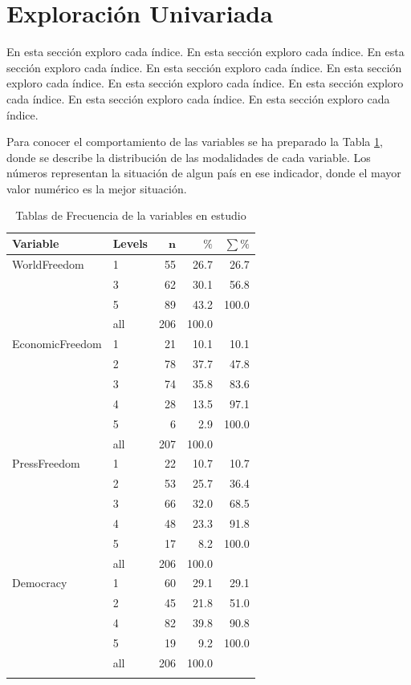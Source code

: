 \section{Exploración Univariada}\label{univariada}

En esta sección exploro cada índice. En esta sección exploro cada índice. En esta sección exploro cada índice. En esta sección exploro cada índice. En esta sección exploro cada índice. En esta sección exploro cada índice. En esta sección exploro cada índice. En esta sección exploro cada índice. En esta sección exploro cada índice.





Para conocer el comportamiento de las variables se ha preparado la Tabla \ref{Tfrecuencias}, donde se describe la distribución de las modalidades de cada variable. Los números representan la situación de algun país en ese indicador, donde el mayor valor numérico es la mejor situación.

\begingroup\normalsize
\begin{longtable}{llrrr}
\caption{Tablas de Frecuencia de la variables en estudio} \\ 
 \textbf{Variable} & \textbf{Levels} & $\mathbf{n}$ & $\mathbf{\%}$ & $\mathbf{\sum \%}$ \\ 
  \hline \hline
WorldFreedom & 1 & 55 & 26.7 & 26.7 \\ 
   & 3 & 62 & 30.1 & 56.8 \\ 
   & 5 & 89 & 43.2 & 100.0 \\ 
   \hline
 & all & 206 & 100.0 &  \\ 
   \hline
\hline
EconomicFreedom & 1 & 21 & 10.1 & 10.1 \\ 
   & 2 & 78 & 37.7 & 47.8 \\ 
   & 3 & 74 & 35.8 & 83.6 \\ 
   & 4 & 28 & 13.5 & 97.1 \\ 
   & 5 & 6 & 2.9 & 100.0 \\ 
   \hline
 & all & 207 & 100.0 &  \\ 
   \hline
\hline
PressFreedom & 1 & 22 & 10.7 & 10.7 \\ 
   & 2 & 53 & 25.7 & 36.4 \\ 
   & 3 & 66 & 32.0 & 68.5 \\ 
   & 4 & 48 & 23.3 & 91.8 \\ 
   & 5 & 17 & 8.2 & 100.0 \\ 
   \hline
 & all & 206 & 100.0 &  \\ 
   \hline
\hline
Democracy & 1 & 60 & 29.1 & 29.1 \\ 
   & 2 & 45 & 21.8 & 51.0 \\ 
   & 4 & 82 & 39.8 & 90.8 \\ 
   & 5 & 19 & 9.2 & 100.0 \\ 
   \hline
 & all & 206 & 100.0 &  \\ 
   \hline
\hline
\hline
\label{Tfrecuencias}
\end{longtable}
\endgroup

